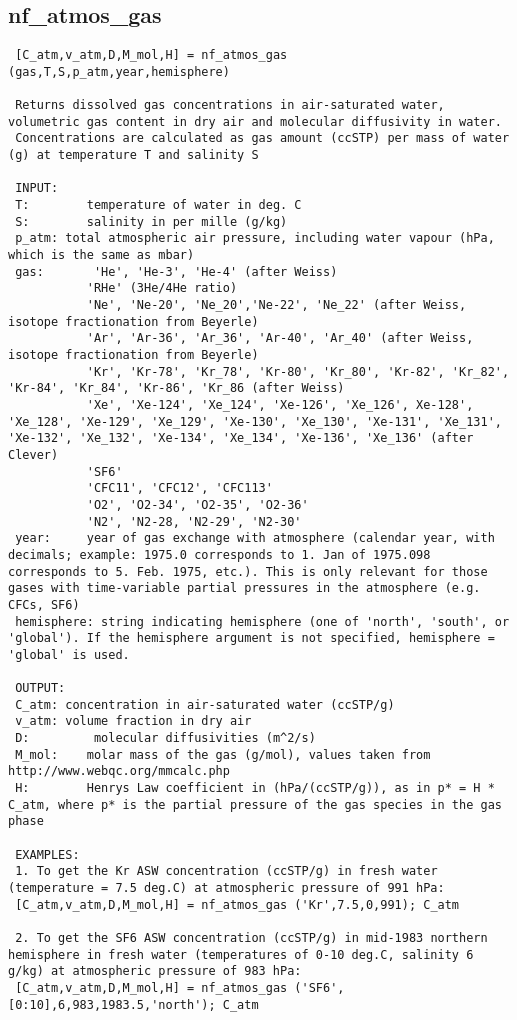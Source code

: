 \subsection{nf\_atmos\_gas}\label{sec:ref-nf_atmos_gas}
\begin{lstlisting}
 [C_atm,v_atm,D,M_mol,H] = nf_atmos_gas (gas,T,S,p_atm,year,hemisphere)

 Returns dissolved gas concentrations in air-saturated water, volumetric gas content in dry air and molecular diffusivity in water.
 Concentrations are calculated as gas amount (ccSTP) per mass of water (g) at temperature T and salinity S

 INPUT:
 T:        temperature of water in deg. C
 S:        salinity in per mille (g/kg)
 p_atm:	total atmospheric air pressure, including water vapour (hPa, which is the same as mbar)
 gas:	    'He', 'He-3', 'He-4' (after Weiss)
           'RHe' (3He/4He ratio)
           'Ne', 'Ne-20', 'Ne_20','Ne-22', 'Ne_22' (after Weiss, isotope fractionation from Beyerle)
           'Ar', 'Ar-36', 'Ar_36', 'Ar-40', 'Ar_40' (after Weiss, isotope fractionation from Beyerle)
           'Kr', 'Kr-78', 'Kr_78', 'Kr-80', 'Kr_80', 'Kr-82', 'Kr_82', 'Kr-84', 'Kr_84', 'Kr-86', 'Kr_86 (after Weiss)
           'Xe', 'Xe-124', 'Xe_124', 'Xe-126', 'Xe_126', Xe-128', 'Xe_128', 'Xe-129', 'Xe_129', 'Xe-130', 'Xe_130', 'Xe-131', 'Xe_131', 'Xe-132', 'Xe_132', 'Xe-134', 'Xe_134', 'Xe-136', 'Xe_136' (after Clever)
           'SF6'
           'CFC11', 'CFC12', 'CFC113'
           'O2', 'O2-34', 'O2-35', 'O2-36'
           'N2', 'N2-28, 'N2-29', 'N2-30'
 year:     year of gas exchange with atmosphere (calendar year, with decimals; example: 1975.0 corresponds to 1. Jan of 1975.098 corresponds to 5. Feb. 1975, etc.). This is only relevant for those gases with time-variable partial pressures in the atmosphere (e.g. CFCs, SF6)
 hemisphere: string indicating hemisphere (one of 'north', 'south', or 'global'). If the hemisphere argument is not specified, hemisphere = 'global' is used.

 OUTPUT:
 C_atm:	concentration in air-saturated water (ccSTP/g)
 v_atm:	volume fraction in dry air
 D: 	    molecular diffusivities (m^2/s)
 M_mol:    molar mass of the gas (g/mol), values taken from http://www.webqc.org/mmcalc.php
 H:        Henrys Law coefficient in (hPa/(ccSTP/g)), as in p* = H * C_atm, where p* is the partial pressure of the gas species in the gas phase

 EXAMPLES:
 1. To get the Kr ASW concentration (ccSTP/g) in fresh water (temperature = 7.5 deg.C) at atmospheric pressure of 991 hPa:
 [C_atm,v_atm,D,M_mol,H] = nf_atmos_gas ('Kr',7.5,0,991); C_atm

 2. To get the SF6 ASW concentration (ccSTP/g) in mid-1983 northern hemisphere in fresh water (temperatures of 0-10 deg.C, salinity 6 g/kg) at atmospheric pressure of 983 hPa:
 [C_atm,v_atm,D,M_mol,H] = nf_atmos_gas ('SF6',[0:10],6,983,1983.5,'north'); C_atm

 
\end{lstlisting}

